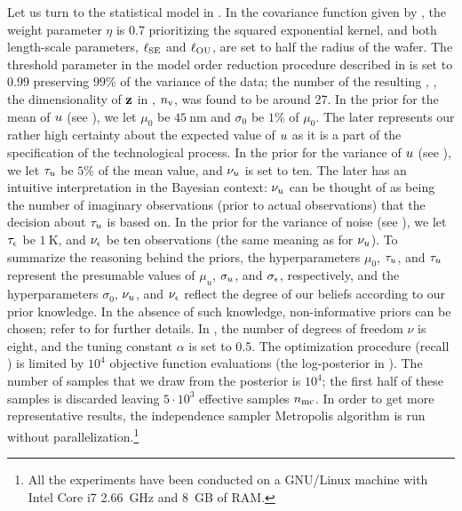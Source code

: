 Let us turn to the statistical model in . In the covariance function given by , the weight parameter $\eta$ is 0.7 prioritizing the squared exponential kernel, and both length-scale parameters, $\ell_{\text{SE}}$ and $\ell_{\text{OU}}$, are set to half the radius of the wafer. The threshold parameter in the model order reduction procedure described in  is set to $0.99$ preserving $99\%$ of the variance of the data; the number of the resulting \rvs, \ie, the dimensionality of $\mathbf{z}$ in , ${n_\text{v}}$, was found to be around 27. In the prior for the mean of $u$ (see ), we let $\mu_0$ be $45~\text{nm}$ and $\sigma_0$ be $1\%$ of $\mu_0$. The later represents our rather high certainty about the expected value of $u$ as it is a part of the specification of the technological process. In the prior for the variance of $u$ (see ), we let $\tau_u$ be $5\%$ of the mean value, and $\nu_u$ is set to ten. The later has an intuitive interpretation in the Bayesian context: $\nu_u$ can be thought of as being the number of imaginary observations (prior to actual observations) that the decision about $\tau_u$ is based on. In the prior for the variance of noise (see ), we let $\tau_\epsilon$ be $1~\text{K}$, and $\nu_\epsilon$ be ten observations (the same meaning as for $\nu_u$). To summarize the reasoning behind the priors, the hyperparameters $\mu_0$, $\tau_u$, and $\tau_u$ represent the presumable values of $\mu_u$, $\sigma_u$, and $\sigma_\epsilon$, respectively, and the hyperparameters $\sigma_0$, $\nu_u$, and $\nu_\epsilon$ reflect the degree of our beliefs according to our prior knowledge. In the absence of such knowledge, non-informative priors can be chosen; refer to \cite{gelman2004} for further details. In , the number of degrees of freedom $\nu$ is eight, and the tuning constant $\alpha$ is set to 0.5. The optimization procedure (recall ) is limited by $10^4$ objective function evaluations (the log-posterior in ). The number of samples that we draw from the posterior is $10^4$; the first half of these samples is discarded leaving $5 \cdot 10^3$ effective samples ${n_\text{mc}}$. In order to get more representative results, the independence sampler Metropolis algorithm is run without parallelization.\footnote{All the experiments have been conducted on a GNU/Linux machine with Intel Core i7 2.66~GHz and 8~GB of RAM.}

